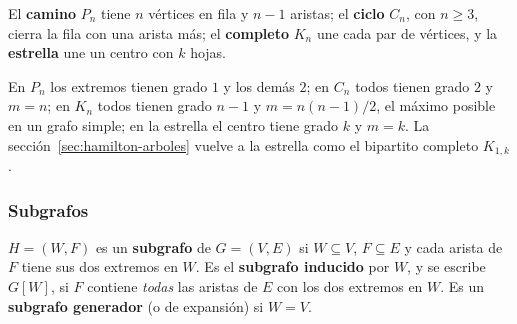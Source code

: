 \documentclass[11pt,letterpaper]{article}
\begin{document}
\begin{ejemplo}
  \label{ej:familias-teoria}
  El \textbf{camino} $P_n$ tiene $n$ vértices en fila y $n - 1$
  aristas; el \textbf{ciclo} $C_n$, con $n \geq 3$, cierra la fila con
  una arista más; el \textbf{completo} $K_n$ une cada par de vértices,
  y la \textbf{estrella} une un centro con $k$ hojas.
  \begin{center}
  \end{center}
  En $P_n$ los extremos tienen grado $1$ y los demás $2$; en $C_n$
  todos tienen grado $2$ y $m = n$; en $K_n$ todos tienen grado $n - 1$
  y $m = n(n-1)/2$, el máximo posible en un grafo simple; en la
  estrella el centro tiene grado $k$ y $m = k$. La
  sección~\ref{sec:hamilton-arboles} vuelve a la estrella como el
  bipartito completo $K_{1,k}$.
\end{ejemplo}

\subsubsection*{Subgrafos}

\begin{definicion}[Subgrafo]
  \label{def:subgrafo}
  $H = (W, F)$ es un \textbf{subgrafo} de $G = (V, E)$ si
  $W \subseteq V$, $F \subseteq E$ y cada arista de $F$ tiene sus dos
  extremos en $W$. Es el \textbf{subgrafo inducido} por $W$, y se
  escribe $G[W]$, si $F$ contiene \emph{todas} las aristas de $E$ con
  los dos extremos en $W$. Es un \textbf{subgrafo generador} (o de
  expansión) si $W = V$.
\end{definicion}
\end{document}
